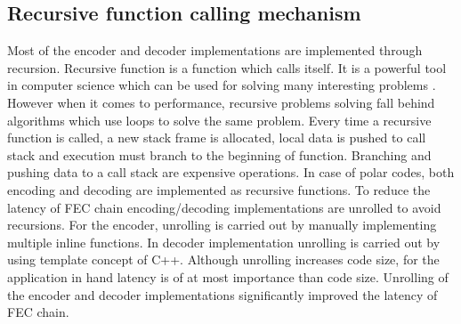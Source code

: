 \subsection{Recursive function calling mechanism}
Most of the encoder and decoder implementations are implemented through recursion. Recursive function is a function which calls itself. It is a powerful tool in computer science which can be used for solving many interesting problems \cite{CLRS}. However when it comes to performance, recursive problems solving fall behind algorithms which use loops to solve the same problem. Every time a recursive function is called, a new stack frame is allocated, local data is pushed to call stack and execution must branch to the beginning of function. Branching and pushing data to a call stack are expensive operations. In case of polar codes, both encoding and decoding are implemented as recursive functions. To reduce the latency of FEC chain encoding/decoding implementations are unrolled to avoid recursions. For the encoder, unrolling is carried out by manually implementing multiple inline functions. In decoder implementation unrolling is carried out by using template concept of C++. Although unrolling increases code size, for the application in hand latency is of at most importance than code size. Unrolling of the encoder and decoder implementations significantly improved the latency of FEC chain. 